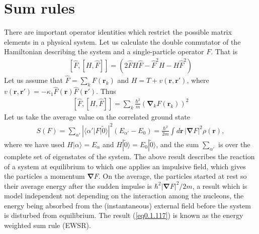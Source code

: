 \documentclass[a4paper,11pt]{book}
\numberwithin{equation}{section}
\numberwithin{figure}{section}
\numberwithin{table}{section}
\newcommand{\braket}[1]{\langle {#1} \rangle }
\newcommand{\ket}[1]{|{#1} \rangle }
\begin{document}
\section{Sum rules}
There are important operator identities which restrict the possible matrix elements in a physical system. Let us calculate the double conmutator of the Hamiltonian describing the system and a single-particle operator $F$. That is
\begin{align}\label{eq0.1.115}
\left[\hat F,\left[H,\hat F\right]\right]=\left(2\hat FH\hat F-\hat F^2H-H\hat F^2\right)
\end{align}
Let us assume that $\hat F=\sum_k F(\mathbf r_k)$ and $H=T+v(\mathbf r, \mathbf r')$, where $v(\mathbf r,\mathbf r')=-\kappa_1 \hat F(\mathbf r)\hat F(\mathbf r')$. Thus 
\begin{align}\label{eq0.1.116}
\left[\hat F,\left[H,\hat F\right]\right]=\sum_k\frac{\hbar^2}{m}\left(\pmb \nabla_kF(\mathbf r_k)\right)^2
\end{align}
Let us take the average value on the correlated ground state
\begin{align}\label{eq0.1.117}
S(F)=\sum_{\alpha'}|\braket{\alpha'|F|\tilde 0}|^2(E_{\alpha'}-E_0)=\frac{\hbar^2}{2m}\int d\mathbf r\, |\pmb\nabla F|^2\rho(\mathbf r),
\end{align}
where we have used $H\ket{\alpha}=E_\alpha$ and $H\ket{\tilde 0}=E_0\ket{\tilde 0}$, and the sum $\sum_{\alpha'}$ is over the complete set of eigenstates of the system. The above result describes the reaction of a system at equilibrium to which one applies an impulsive field, which gives the particles a momentum $\pmb \nabla F$. On the average, the particles started at rest so their average energy after the sudden impulse is $\hbar^2|\pmb \nabla F|^2/2m$, a result which is model independent not depending on the interaction among the nucleons, the energy being absorbed from the (instantaneous) external field before the system is disturbed from equilibrium. The result (\ref{eq0.1.117}) is known as the energy weighted sum rule (EWSR). 
\end{document}
